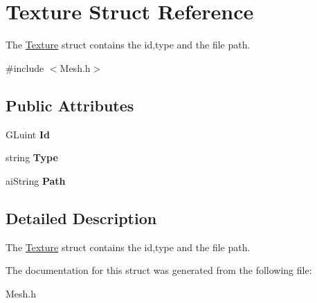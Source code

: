 \hypertarget{struct_texture}{}\section{Texture Struct Reference}
\label{struct_texture}


The \hyperlink{struct_texture}{Texture} struct contains the id,type and the file path.  




{\ttfamily \#include $<$Mesh.\+h$>$}

\subsection*{Public Attributes}
\begin{DoxyCompactItemize}
\item 
\hypertarget{struct_texture_acf30e9166c5024f270dc826e66693fcd}{}G\+Luint {\bfseries Id}\label{struct_texture_acf30e9166c5024f270dc826e66693fcd}

\item 
\hypertarget{struct_texture_a62ae00f64423f7af8b880cdc72bfbb7f}{}string {\bfseries Type}\label{struct_texture_a62ae00f64423f7af8b880cdc72bfbb7f}

\item 
\hypertarget{struct_texture_a0742fa0e3bab2af20a9d94837e1eae44}{}ai\+String {\bfseries Path}\label{struct_texture_a0742fa0e3bab2af20a9d94837e1eae44}

\end{DoxyCompactItemize}


\subsection{Detailed Description}
The \hyperlink{struct_texture}{Texture} struct contains the id,type and the file path. 

The documentation for this struct was generated from the following file\+:\begin{DoxyCompactItemize}
\item 
Mesh.\+h\end{DoxyCompactItemize}
